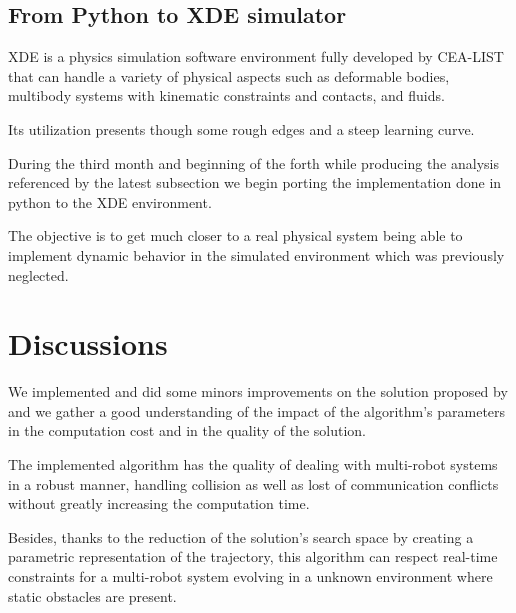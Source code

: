 \subsection{From Python to XDE simulator}

XDE is a physics simulation software environment fully developed by CEA-LIST that can handle a variety of physical aspects such as deformable bodies, multibody systems with kinematic constraints and contacts, and fluids.

Its utilization presents though some rough edges and a steep learning curve.

During the third month and beginning of the forth while producing the analysis referenced by the latest subsection we begin porting the implementation done in python to the XDE environment. 

The objective is to get much closer to a real physical system being able to implement dynamic behavior in the simulated environment which was previously neglected.

\section{Discussions}

We implemented and did some minors improvements on the solution proposed by \cite{Defoort2007a} and we gather a good understanding of the impact of the algorithm's parameters in the computation cost and in the quality of the solution.

The implemented algorithm has the quality of dealing with multi-robot systems in a robust manner, handling collision as well as lost of communication conflicts without greatly increasing the computation time.

Besides, thanks to the reduction of the solution's search space by creating a parametric representation of the trajectory, this algorithm can respect real-time constraints for a multi-robot system evolving in a unknown environment where static obstacles are present.

